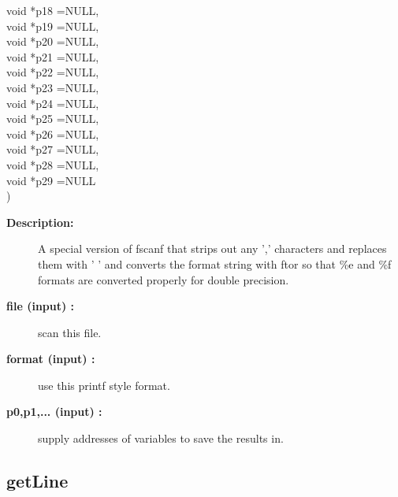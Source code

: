 \begin{flushleft}
{\hspace{\otherStuffIncludeArgIndent}void *p18  =NULL,\\ 
\hspace{\otherStuffIncludeArgIndent}void *p19  =NULL,\\ 
\hspace{\otherStuffIncludeArgIndent}void *p20  =NULL,\\ 
\hspace{\otherStuffIncludeArgIndent}void *p21  =NULL,\\ 
\hspace{\otherStuffIncludeArgIndent}void *p22  =NULL,\\ 
\hspace{\otherStuffIncludeArgIndent}void *p23  =NULL,\\ 
\hspace{\otherStuffIncludeArgIndent}void *p24  =NULL,\\ 
\hspace{\otherStuffIncludeArgIndent}void *p25  =NULL,\\ 
\hspace{\otherStuffIncludeArgIndent}void *p26  =NULL,\\ 
\hspace{\otherStuffIncludeArgIndent}void *p27  =NULL,\\ 
\hspace{\otherStuffIncludeArgIndent}void *p28  =NULL,\\ 
\hspace{\otherStuffIncludeArgIndent}void *p29  =NULL\\ 
\hspace{\otherStuffIncludeArgIndent})
}\end{flushleft}
\begin{description}
\item[{\bf Description:}] 
   A special version of fscanf that strips out any ',' characters
 and replaces them with ' ' and converts the format string with ftor so that
 \%e and \%f formats are converted properly for double precision. 
\item[{\bf file (input) :}]  scan this file.
\item[{\bf format (input) :}]  use this printf style format.
\item[{\bf p0,p1,... (input) :}]  supply addresses of variables to save the results in.
\end{description}
\subsection{getLine}
 
